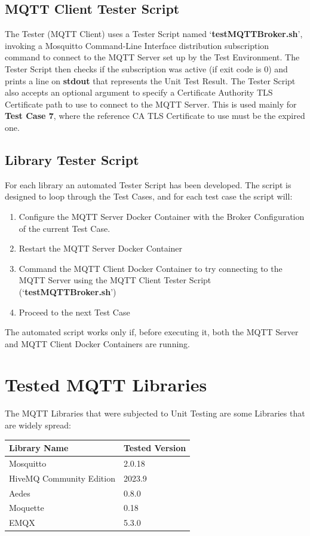 \documentclass[binding=0.6cm,noexaminfo]{sapthesis}
\begin{document}
\section{MQTT Client Tester Script}

The Tester (MQTT Client) uses a Tester Script named `\textbf{testMQTTBroker.sh}', invoking a Mosquitto Command-Line Interface distribution subscription command to connect to the MQTT Server set up by the Test Environment. The Tester Script then checks if the subscription was active (if exit code is 0) and prints a line on \textbf{stdout} that represents the Unit Test Result.
The Tester Script also accepts an optional argument to specify a Certificate Authority TLS Certificate path to use to connect to the MQTT Server. This is used mainly for \textbf{Test Case 7}, where the reference CA TLS Certificate to use must be the expired one.
\section{Library Tester Script}

For each library an automated Tester Script has been developed. The script is designed to loop through the Test Cases, and for each test case the script will:
\begin{enumerate}
	\item Configure the MQTT Server Docker Container with the Broker Configuration of the current Test Case.
	\item Restart the MQTT Server Docker Container
	\item Command the MQTT Client Docker Container to try connecting to the MQTT Server using the MQTT Client Tester Script (`\textbf{testMQTTBroker.sh}')
	\item Proceed to the next Test Case
\end{enumerate}
The automated script works only if, before executing it, both the MQTT Server and MQTT Client Docker Containers are running.

\chapter{Tested MQTT Libraries}
The MQTT Libraries that were subjected to Unit Testing are some Libraries that are widely spread:

\begin{center}
\begin{tabular}{| p{6cm} | p{6cm} |}
\hline
\textbf{Library Name} & \textbf{Tested Version} \\
\hline
Mosquitto & 2.0.18 \\
\hline
HiveMQ Community Edition & 2023.9 \\
\hline
Aedes & 0.8.0 \\
\hline
Moquette & 0.18 \\
\hline
EMQX & 5.3.0 \\
\hline
\end{tabular}
\end{center}
\end{document}
